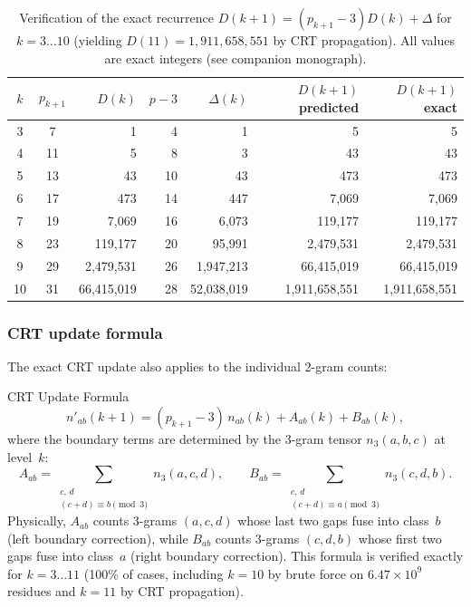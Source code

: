 \documentclass[12pt,a4paper]{article}
\begin{document}
\begin{table}[htbp]
\centering
\caption{Verification of the exact recurrence $D(k+1) = (p_{k+1}-3)D(k) + \Delta$
for $k = 3\ldots 10$ (yielding $D(11) = 1{,}911{,}658{,}551$ by CRT propagation).
All values are exact integers (see companion monograph).}
\label{tab:recurrence_check}
\begin{tabular}{ccrrrrr}
\toprule
$k$ & $p_{k+1}$ & $D(k)$ & $p-3$ & $\Delta(k)$ & $D(k+1)$ predicted & $D(k+1)$ exact \\
\midrule
 3 &  7 & 1             & 4  & 1             & 5              & 5 \\
 4 & 11 & 5             & 8  & 3             & 43             & 43 \\
 5 & 13 & 43            & 10 & 43            & 473            & 473 \\
 6 & 17 & 473           & 14 & 447           & 7{,}069        & 7{,}069 \\
 7 & 19 & 7{,}069       & 16 & 6{,}073       & 119{,}177      & 119{,}177 \\
 8 & 23 & 119{,}177     & 20 & 95{,}991      & 2{,}479{,}531  & 2{,}479{,}531 \\
 9 & 29 & 2{,}479{,}531 & 26 & 1{,}947{,}213 & 66{,}415{,}019 & 66{,}415{,}019 \\
10 & 31 & 66{,}415{,}019 & 28 & 52{,}038{,}019 & 1{,}911{,}658{,}551 & 1{,}911{,}658{,}551 \\
\bottomrule
\end{tabular}
\end{table}

\subsubsection{CRT update formula}

The exact CRT update also applies to the individual 2-gram counts:

\begin{thmbox}{CRT Update Formula}
\label{thm:crt_update}
\begin{equation}
  n'_{ab}(k+1) = (p_{k+1} - 3)\,n_{ab}(k) + A_{ab}(k) + B_{ab}(k),
  \label{eq:crt_update}
\end{equation}
where the boundary terms are determined by the 3-gram tensor
$n_3(a,b,c)$ at level~$k$:
\begin{equation}
  A_{ab} = \!\!\sum_{\substack{c,\,d \\ (c+d) \equiv b \pmod{3}}}
  \!\! n_3(a,c,d), \qquad
  B_{ab} = \!\!\sum_{\substack{c,\,d \\ (c+d) \equiv a \pmod{3}}}
  \!\! n_3(c,d,b).
  \label{eq:crt_AB}
\end{equation}
Physically, $A_{ab}$ counts 3-grams $(a,c,d)$ whose last two gaps
fuse into class~$b$ (left boundary correction), while $B_{ab}$ counts
3-grams $(c,d,b)$ whose first two gaps fuse into class~$a$ (right
boundary correction).
This formula is verified exactly for
$k = 3\ldots 11$ (100\% of cases, including $k = 10$ by brute force
on $6.47 \times 10^9$ residues and $k = 11$ by CRT propagation).
\end{thmbox}
\end{document}

